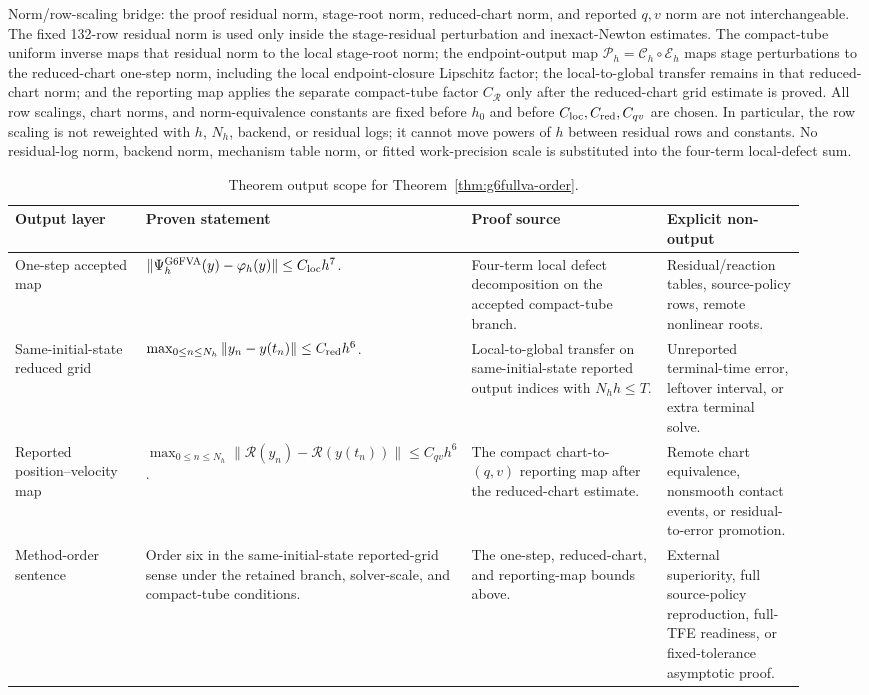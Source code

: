 \documentclass[preprint,12pt]{elsarticle}
\newcommand{\tfe}{TFE}
\begin{document}
Norm/row-scaling bridge: the proof residual norm, stage-root
norm, reduced-chart norm, and reported \(q,v\) norm are not interchangeable.
The fixed 132-row residual norm is used only inside the
stage-residual perturbation and inexact-Newton estimates. The compact-tube
uniform inverse maps that residual norm to the local stage-root norm; the
endpoint-output map \(\mathcal P_h=\mathcal C_h\circ\mathcal E_h\) maps stage
perturbations to the reduced-chart one-step norm, including the local
endpoint-closure Lipschitz factor; the local-to-global transfer remains in
that reduced-chart norm; and the reporting map applies the separate
compact-tube factor
\(C_{\mathcal R}\) only after the reduced-chart grid estimate is proved. All
row scalings, chart norms, and norm-equivalence constants are fixed before
\(h_0\) and before \(C_{\rm loc},C_{\rm red},C_{qv}\) are chosen. In
particular, the row scaling is not reweighted with \(h\), \(N_h\), backend,
or residual logs; it cannot move powers of \(h\) between residual rows and
constants. No
residual-log norm, backend norm, mechanism table norm, or fitted
work-precision scale is substituted into the four-term local-defect sum.

\begin{table}[htbp]
\centering
\caption{Theorem output scope for
Theorem~\ref{thm:g6fullva-order}.}
\label{tab:theorem-output-scope-ledger}
\scriptsize
\setlength{\tabcolsep}{2pt}
\renewcommand{\arraystretch}{0.9}
\begin{tabular}{P{0.18\linewidth}P{0.29\linewidth}P{0.27\linewidth}P{0.18\linewidth}}
\toprule
Output layer & Proven statement & Proof source & Explicit non-output \\
\midrule
One-step accepted map &
\(\|\Psi_h^{\mathrm{G6FVA}}(y)-\varphi_h(y)\|\le C_{\rm loc}h^7\). &
Four-term local defect decomposition on the accepted compact-tube branch. &
Residual/reaction tables, source-policy rows, remote nonlinear roots. \\
Same-initial-state reduced grid &
\(\max_{0\le n\le N_h}\|y_n-y(t_n)\|\le C_{\rm red}h^6\). &
Local-to-global transfer on same-initial-state reported output indices with \(N_hh\le T\). &
Unreported terminal-time error, leftover interval, or extra terminal solve. \\
Reported position--velocity map &
\(\max_{0\le n\le N_h}\|\mathcal R(y_n)-\mathcal R(y(t_n))\|\le C_{qv}h^6\). &
The compact chart-to-\((q,v)\) reporting map after the reduced-chart estimate. &
Remote chart equivalence, nonsmooth contact events, or residual-to-error
promotion. \\
Method-order sentence &
Order six in the same-initial-state reported-grid sense under the retained branch,
solver-scale, and compact-tube conditions. &
The one-step, reduced-chart, and reporting-map bounds above. &
External superiority, full source-policy reproduction, full-\tfe{} readiness,
or fixed-tolerance asymptotic proof. \\
\bottomrule
\end{tabular}
\end{table}
\end{document}
